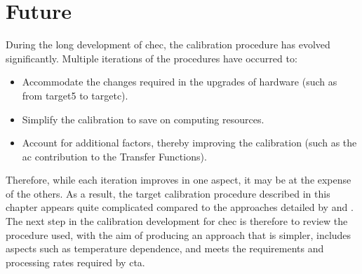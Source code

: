 \section{Future}

During the long development of \gls{chec}, the calibration procedure has evolved significantly. Multiple iterations of the procedures have occurred to:
\begin{itemize}
	\item Accommodate the changes required in the upgrades of hardware (such as from \gls{target5} to \gls{targetc}).
	\item Simplify the calibration to save on computing resources.
	\item Account for additional factors, thereby improving the calibration (such as the \gls{ac} contribution to the Transfer Functions).
\end{itemize}
Therefore, while each iteration improves in one aspect, it may be at the expense of the others. As a result, the \gls{target} calibration procedure described in this chapter appears quite complicated compared to the approaches detailed by \textcite{Bechtol2012} and \textcite{Albert2017}. The next step in the calibration development for \gls{chec} is therefore to review the procedure used, with the aim of producing an approach that is simpler, includes aspects such as temperature dependence, and meets the requirements and processing rates required by \gls{cta}.
